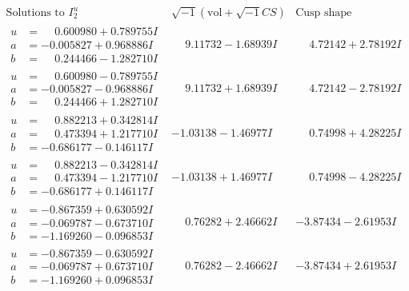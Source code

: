 \documentclass[1p]{elsarticle_modified}
\theoremstyle{definition}
\newcommand{\I}{\sqrt{-1}}
\begin{document}
$$\begin{array}{c|c|c}  
\text{Solutions to }I^u_{2}& \I (\text{vol} + \sqrt{-1}CS) & \text{Cusp shape}\\
 \hline 
\begin{aligned}
u &= \phantom{-}0.600980 + 0.789755 I \\
a &= -0.005827 + 0.968886 I \\
b &= \phantom{-}0.244466 - 1.282710 I\end{aligned}
 & \phantom{-}9.11732 - 1.68939 I & \phantom{-}4.72142 + 2.78192 I \\ \hline\begin{aligned}
u &= \phantom{-}0.600980 - 0.789755 I \\
a &= -0.005827 - 0.968886 I \\
b &= \phantom{-}0.244466 + 1.282710 I\end{aligned}
 & \phantom{-}9.11732 + 1.68939 I & \phantom{-}4.72142 - 2.78192 I \\ \hline\begin{aligned}
u &= \phantom{-}0.882213 + 0.342814 I \\
a &= \phantom{-}0.473394 + 1.217710 I \\
b &= -0.686177 - 0.146117 I\end{aligned}
 & -1.03138 - 1.46977 I & \phantom{-}0.74998 + 4.28225 I \\ \hline\begin{aligned}
u &= \phantom{-}0.882213 - 0.342814 I \\
a &= \phantom{-}0.473394 - 1.217710 I \\
b &= -0.686177 + 0.146117 I\end{aligned}
 & -1.03138 + 1.46977 I & \phantom{-}0.74998 - 4.28225 I \\ \hline\begin{aligned}
u &= -0.867359 + 0.630592 I \\
a &= -0.069787 - 0.673710 I \\
b &= -1.169260 - 0.096853 I\end{aligned}
 & \phantom{-}0.76282 + 2.46662 I & -3.87434 - 2.61953 I \\ \hline\begin{aligned}
u &= -0.867359 - 0.630592 I \\
a &= -0.069787 + 0.673710 I \\
b &= -1.169260 + 0.096853 I\end{aligned}
 & \phantom{-}0.76282 - 2.46662 I & -3.87434 + 2.61953 I \\ \hline\begin{aligned}

\end{aligned}
\end{array}$$
\end{document}
